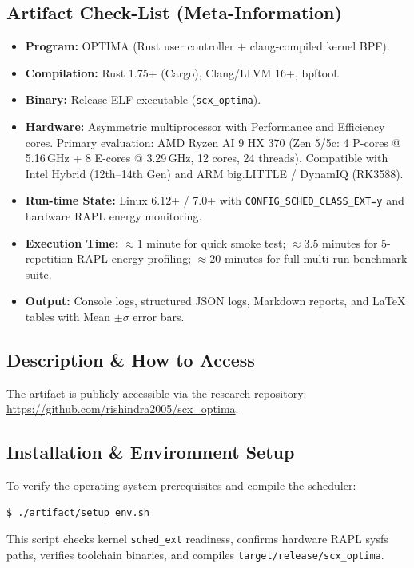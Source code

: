 \documentclass[letterpaper,twocolumn,10pt]{article}
\begin{document}
\subsection{Artifact Check-List (Meta-Information)}
\begin{itemize}
    \item \textbf{Program:} OPTIMA (Rust user controller + clang-compiled kernel BPF).
    \item \textbf{Compilation:} Rust 1.75+ (Cargo), Clang/LLVM 16+, bpftool.
    \item \textbf{Binary:} Release ELF executable (\texttt{scx\_optima}).
    \item \textbf{Hardware:} Asymmetric multiprocessor with Performance and Efficiency cores. Primary evaluation: AMD Ryzen AI 9 HX 370 (Zen 5/5c: 4 P-cores @ 5.16\,GHz + 8 E-cores @ 3.29\,GHz, 12 cores, 24 threads). Compatible with Intel Hybrid (12th--14th Gen) and ARM big.LITTLE / DynamIQ (RK3588).
    \item \textbf{Run-time State:} Linux 6.12+ / 7.0+ with \texttt{CONFIG\_SCHED\_CLASS\_EXT=y} and hardware RAPL energy monitoring.
    \item \textbf{Execution Time:} $\approx 1$ minute for quick smoke test; $\approx 3.5$ minutes for 5-repetition RAPL energy profiling; $\approx 20$ minutes for full multi-run benchmark suite.
    \item \textbf{Output:} Console logs, structured JSON logs, Markdown reports, and LaTeX tables with Mean $\pm \sigma$ error bars.
\end{itemize}

\subsection{Description \& How to Access}
The artifact is publicly accessible via the research repository:\\
\url{https://github.com/rishindra2005/scx_optima}.

\subsection{Installation \& Environment Setup}
To verify the operating system prerequisites and compile the scheduler:
\begin{verbatim}
$ ./artifact/setup_env.sh
\end{verbatim}
This script checks kernel \texttt{sched\_ext} readiness, confirms hardware RAPL sysfs paths, verifies toolchain binaries, and compiles \texttt{target/release/scx\_optima}.
\end{document}

